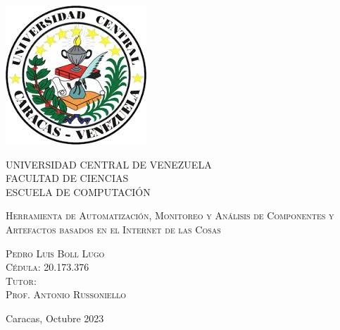 \thispagestyle{empty}

\begin{minipage}[c][0.01\textheight][t]{0.85\textwidth}
\begin{center}

\includegraphics[scale=0.8]{./Figuras/ucv_logo.jpg}

\bigskip\bigskip\bigskip

{\centering \scshape \large
UNIVERSIDAD CENTRAL DE VENEZUELA \\
FACULTAD DE CIENCIAS \\
ESCUELA DE COMPUTACIÓN \\[38pt]}


\bigskip
{\scshape \LARGE 
Herramienta de Automatización, Monitoreo y Análisis de Componentes y Artefactos basados en el Internet de las Cosas 
\\[60pt]} 

\vspace{5mm}

{ \scshape \renewcommand\baselinestretch{1}\selectfont    
Pedro Luis Boll Lugo\\
Cédula: 20.173.376 \\[30pt]

Tutor:\\
Prof. Antonio Russoniello\\[30pt]

\vspace{10mm}

Caracas, Octubre 2023\\[60pt]
\vfill
}


\end{center}
\end{minipage}